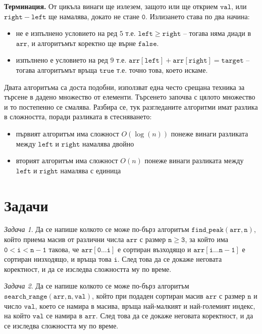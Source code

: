 \documentclass{article}
\theoremstyle{definition}
\theoremstyle{plain}
\theoremstyle{remark}
\newtheorem{problem}{Задача}
\theoremstyle{definition}
\begin{document}
\textbf{Терминация.}
От цикъла винаги ще излезем, защото или ще открием $\mathtt{val}$, или $\mathtt{right - left}$ ще намалява, докато не стане $\mathtt{0}$.
Излизането става по два начина:
\begin{itemize}
    \item не е изпълнено условието на ред $5$ т.е. $\mathtt{left \geq right}$ -- тогава няма диади в $\mathtt{arr}$, и алгоритъмът коректно ще върне $\mathtt{false}$.
    \item изпълнено е условието на ред $9$ т.е. $\mathtt{arr[left] + arr[right] = target}$ -- тогава алгоритъмът връща $\mathtt{true}$ т.е. точно това, което искаме.
\end{itemize}

Двата алгоритъма са доста подобни, използват една често срещана техника за търсене в дадено множество от елементи.
Търсенето започва с цялото множество и то постепенно се смалява.
Разбира се, тук разгледаните алгоритми имат разлика в сложността, поради разликата в стесняването:
\begin{itemize}
    \item първият алгоритъм има сложност $O(\log(n))$ понеже винаги разликата между $\mathtt{left}$ и $\mathtt{right}$ намалява двойно
    \item вторият алгоритъм има сложност $O(n)$ понеже винаги разликата между $\mathtt{left}$ и $\mathtt{right}$ намалява с единица
\end{itemize}

\section*{Задачи}

\begin{problem}
Да се напише колкото се може по-бърз алгоритъм $\mathtt{find\_peak(arr, n)}$, който приема масив от различни числа $\mathtt{arr}$ с размер $\mathtt{n \geq 3}$, за който има $\mathtt{0 < i < n - 1}$ такова, че $\mathtt{arr[0 \dots i]}$ е сортиран възходящо и $\mathtt{arr[i \dots n - 1]}$ е сортиран низходящо, и връща това $\mathtt{i}$.
След това да се докаже неговата коректност, и да се изследва сложността му по време.
\end{problem}

\begin{problem}
Да се напише колкото се може по-бърз алгоритъм $\mathtt{search\_range(arr, n, val)}$, който при подаден сортиран масив $\mathtt{arr}$ с размер $\mathtt{n}$ и число $\mathtt{val}$, което се намира в масива, връща най-малкият и най-големият индекс, на който $\mathtt{val}$ се намира в $\mathtt{arr}$.
След това да се докаже неговата коректност, и да се изследва сложността му по време.
\end{problem}
\end{document}
